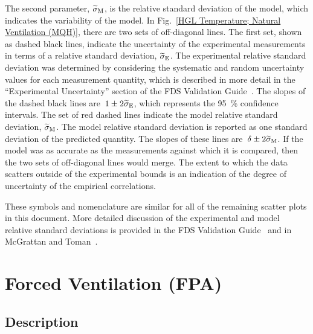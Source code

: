 The second parameter, $\widetilde{\sigma}_{\rm M}$, is the relative standard deviation of the model, which indicates the variability of the model. In Fig.~\ref{HGL Temperature; Natural Ventilation (MQH)}, there are two sets of off-diagonal lines. The first set, shown as dashed black lines, indicate the uncertainty of the experimental measurements in terms of a relative standard deviation, $\widetilde{\sigma}_{\rm E}$. The experimental relative standard deviation was determined by considering the systematic and random uncertainty values for each measurement quantity, which is described in more detail in the ``Experimental Uncertainty'' section of the FDS Validation Guide~\cite{FDS_Validation_Guide}. The slopes of the dashed black lines are~$1 \pm 2\widetilde{\sigma}_{\rm E}$, which represents the \SI{95}{\percent} confidence intervals. The set of red dashed lines indicate the model relative standard deviation, $\widetilde{\sigma}_{\rm M}$. The model relative standard deviation is reported as one standard deviation of the predicted quantity. The slopes of these lines are~$\delta \pm 2\widetilde{\sigma}_{\rm M}$. If the model was as accurate as the measurements against which it is compared, then the two sets of off-diagonal lines would merge. The extent to which the data scatters outside of the experimental bounds is an indication of the degree of uncertainty of the empirical correlations.

These symbols and nomenclature are similar for all of the remaining scatter plots in this document. More detailed discussion of the experimental and model relative standard deviations is provided in the FDS Validation Guide~\cite{FDS_Validation_Guide} and in McGrattan and Toman~\cite{McGrattan:Metrologia}.


\clearpage


\section{Forced Ventilation (FPA)}
\label{sec:FPA}

\subsection*{Description}

